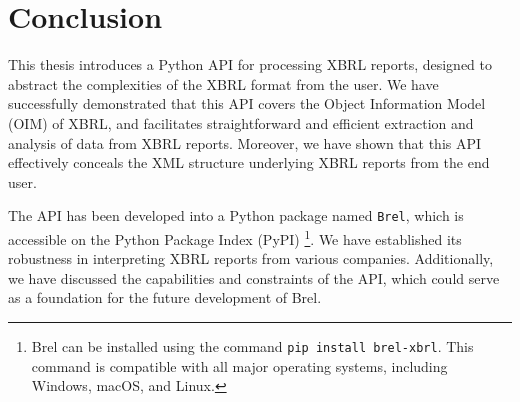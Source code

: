 \chapter{Conclusion}
\label{chapter:conclusion}

This thesis introduces a Python API for processing XBRL reports, designed to abstract the complexities of the XBRL format from the user.
We have successfully demonstrated that this API covers the Object Information Model (OIM) of XBRL,
and facilitates straightforward and efficient extraction and analysis of data from XBRL reports.
Moreover, we have shown that this API effectively conceals the XML structure underlying XBRL reports from the end user.

The API has been developed into a Python package named \texttt{Brel},
which is accessible on the Python Package Index (PyPI)
\footnote{Brel can be installed using the command \texttt{pip install brel-xbrl}. This command is compatible with all major operating systems, including Windows, macOS, and Linux.}.
We have established its robustness in interpreting XBRL reports from various companies.
Additionally, we have discussed the capabilities and constraints of the API,
which could serve as a foundation for the future development of Brel.

